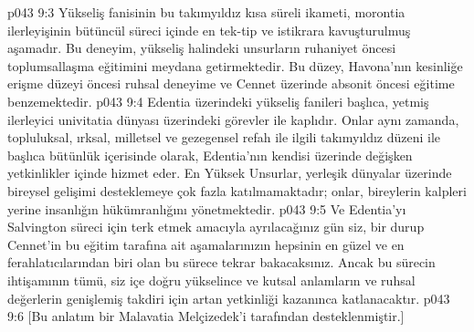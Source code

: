 \vs p043 9:3 Yükseliş fanisinin bu takımyıldız kısa süreli ikameti, morontia ilerleyişinin bütüncül süreci içinde en tek\hyp{}tip ve istikrara kavuşturulmuş aşamadır. Bu deneyim, yükseliş halindeki unsurların ruhaniyet öncesi toplumsallaşma eğitimini meydana getirmektedir. Bu düzey, Havona’nın kesinliğe erişme düzeyi öncesi ruhsal deneyime ve Cennet üzerinde absonit öncesi eğitime benzemektedir.
\vs p043 9:4 Edentia üzerindeki yükseliş fanileri başlıca, yetmiş ilerleyici univitatia dünyası üzerindeki görevler ile kaplıdır. Onlar aynı zamanda, topluluksal, ırksal, milletsel ve gezegensel refah ile ilgili takımyıldız düzeni ile başlıca bütünlük içerisinde olarak, Edentia’nın kendisi üzerinde değişken yetkinlikler içinde hizmet eder. En Yüksek Unsurlar, yerleşik dünyalar üzerinde bireysel gelişimi desteklemeye çok fazla katılmamaktadır; onlar, bireylerin kalpleri yerine insanlığın hükümranlığını yönetmektedir.
\vs p043 9:5 Ve Edentia’yı Salvington süreci için terk etmek amacıyla ayrılacağınız gün siz, bir durup Cennet’in bu eğitim tarafına ait aşamalarınızın hepsinin en güzel ve en ferahlatıcılarından biri olan bu sürece tekrar bakacaksınız. Ancak bu sürecin ihtişamının tümü, siz içe doğru yükselince ve kutsal anlamların ve ruhsal değerlerin genişlemiş takdiri için artan yetkinliği kazanınca katlanacaktır.
\vs p043 9:6 [Bu anlatım bir Malavatia Melçizedek’i tarafından desteklenmiştir.]
